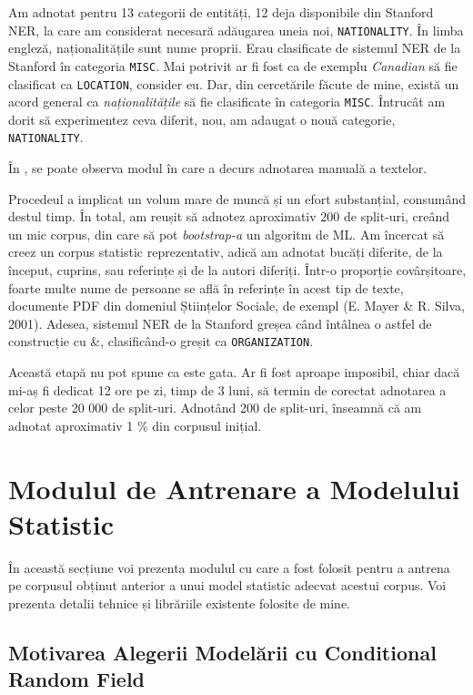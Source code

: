 Am adnotat pentru 13 categorii de entități, 12 deja disponibile din Stanford NER, la care am considerat necesară adăugarea uneia noi, \texttt{NATIONALITY}. În limba engleză, naționalitățile sunt nume proprii. Erau clasificate de sistemul NER de la Stanford în categoria \texttt{MISC}. Mai potrivit ar fi fost ca de exemplu \textit{Canadian} să fie clasificat ca \texttt{LOCATION}, consider eu. Dar, din cercetările făcute de mine, există un acord general ca \textit{naționalitățile} să fie clasificate în categoria \texttt{MISC}. Întrucât am dorit să experimentez ceva diferit, nou, am adaugat o nouă categorie, \texttt{NATIONALITY}.

În , se poate observa modul în care a decurs adnotarea manuală a textelor. 


Procedeul a implicat un volum mare de muncă și un efort substanțial, consumând destul timp. În total, am reușit să adnotez aproximativ 200 de split-uri, creând un mic corpus, din care să pot \textit{bootstrap-a} un algoritm de ML. Am încercat să creez un corpus statistic reprezentativ, adică am adnotat bucăți diferite, de la început, cuprins, sau referințe și de la autori diferiți. Într-o proporție covârșitoare, foarte multe nume de persoane se află în referințe în acest tip de texte, documente PDF din domeniul Științelor Sociale, de exempl (E. Mayer \& R. Silva, 2001). Adesea, sistemul NER de la Stanford greșea când întâlnea o astfel de construcție cu \&, clasificând-o greșit ca \texttt{ORGANIZATION}.

Această etapă nu pot spune ca este gata. Ar fi fost aproape imposibil, chiar dacă mi-aș fi dedicat 12 ore pe zi, timp de 3 luni, să termin de corectat adnotarea a celor peste 20 000 de split-uri. Adnotând 200 de split-uri, înseamnă că am adnotat aproximativ 1 \% din corpusul inițial.

\section {Modulul de Antrenare a Modelului Statistic}

În această secțiune voi prezenta modulul cu care a fost folosit pentru a antrena pe corpusul obținut anterior a unui model statistic adecvat acestui corpus. Voi prezenta detalii tehnice și librăriile existente folosite de mine.

\subsection{Motivarea Alegerii Modelării cu Conditional Random Field}

